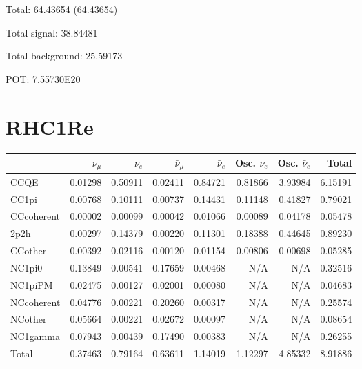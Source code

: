 \documentclass[10pt,a4paper]{article}
\begin{document}
Total: 64.43654    (64.43654)


Total signal: 38.84481


Total background: 25.59173

POT: 7.55730E20


\section*{RHC1Re}
\begin{tabular} { | l ||r | r | r | r | r | r | | r | }
\hline
              & $\nu_\mu$            & $\nu_e$              & $\bar{\nu}_{\mu}$    & $\bar{\nu}_{e}$      & Osc. $\nu_e$         & Osc. $\bar{\nu}_{e}$ & Total                \\ \hline\hline
 CCQE         & 0.01298              & 0.50911              & 0.02411              & 0.84721              & 0.81866              & 3.93984              & 6.15191              \\ \hline
 CC1pi        & 0.00768              & 0.10111              & 0.00737              & 0.14431              & 0.11148              & 0.41827              & 0.79021              \\ \hline
 CCcoherent   & 0.00002              & 0.00099              & 0.00042              & 0.01066              & 0.00089              & 0.04178              & 0.05478              \\ \hline
 2p2h         & 0.00297              & 0.14379              & 0.00220              & 0.11301              & 0.18388              & 0.44645              & 0.89230              \\ \hline
 CCother      & 0.00392              & 0.02116              & 0.00120              & 0.01154              & 0.00806              & 0.00698              & 0.05285              \\ \hline
 NC1pi0       & 0.13849              & 0.00541              & 0.17659              & 0.00468              & N/A                  & N/A                  & 0.32516              \\ \hline
 NC1piPM      & 0.02475              & 0.00127              & 0.02001              & 0.00080              & N/A                  & N/A                  & 0.04683              \\ \hline
 NCcoherent   & 0.04776              & 0.00221              & 0.20260              & 0.00317              & N/A                  & N/A                  & 0.25574              \\ \hline
 NCother      & 0.05664              & 0.00221              & 0.02672              & 0.00097              & N/A                  & N/A                  & 0.08654              \\ \hline
 NC1gamma     & 0.07943              & 0.00439              & 0.17490              & 0.00383              & N/A                  & N/A                  & 0.26255              \\ \hline
\hline
 Total        & 0.37463              & 0.79164              & 0.63611              & 1.14019              & 1.12297              & 4.85332              & 8.91886              \\ \hline

\end{tabular}
\end{document}
